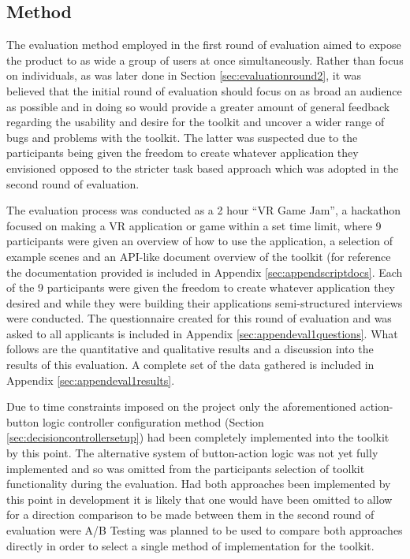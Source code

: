 \documentclass{l4proj}
\begin{document}
\subsection{Method}
\label{sec:evlauationmethod1}
The evaluation method employed in the first round of evaluation aimed to expose the product to as wide a group of users at once simultaneously. Rather than focus on individuals, as was later done in Section \ref{sec:evaluationround2}, it was believed that the initial round of evaluation should focus on as broad an audience as possible and in doing so would provide a greater amount of general feedback regarding the usability and desire for the toolkit and uncover a wider range of bugs and problems with the toolkit. The latter was suspected due to the participants being given the freedom to create whatever application they envisioned opposed to the stricter task based approach which was adopted in the second round of evaluation.

The evaluation process was conducted as a 2 hour ``VR Game Jam'', a hackathon focused on making a VR application or game within a set time limit, where 9 participants were given an overview of how to use the application, a selection of example scenes and an API-like document overview of the toolkit (for reference the documentation provided is included in Appendix \ref{sec:appendscriptdocs}. Each of the 9 participants were given the freedom to create whatever application they desired and while they were building their applications semi-structured interviews were conducted. The questionnaire created for this round of evaluation and was asked to all applicants is included in Appendix \ref{sec:appendeval1questions}. What follows are the quantitative and qualitative results and a discussion into the results of this evaluation. A complete set of the data gathered is included in Appendix \ref{sec:appendeval1results}.

Due to time constraints imposed on the project only the aforementioned action-button logic controller configuration method (Section \ref{sec:decisioncontrollersetup}) had been completely implemented into the toolkit by this point. The alternative system of button-action logic was not yet fully implemented and so was omitted from the participants selection of toolkit functionality during the evaluation. Had both approaches been implemented by this point in development it is likely that one would have been omitted to allow for a direction comparison to be made between them in the second round of evaluation were A/B Testing was planned to be used to compare both approaches directly in order to select a single method of implementation for the toolkit.
\end{document}
